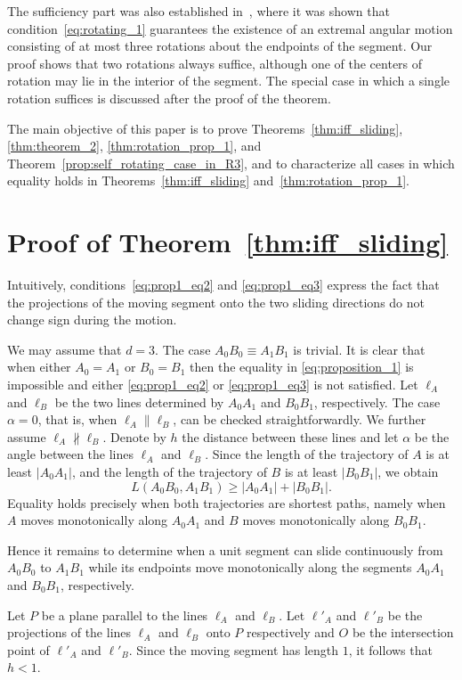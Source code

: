 \documentclass[a4paper,12pt,reqno]{amsart}
\begin{document}
The sufficiency part was also established in~\cite{IckingRoteWelzlYap1993}, where it was shown that condition~\eqref{eq:rotating_1} guarantees the existence of an extremal angular motion consisting of at most three rotations about the endpoints of the segment. Our proof shows that two rotations always suffice, although one of the centers of rotation may lie in the interior of the segment. The special case in which a single rotation suffices is discussed after the proof of the theorem.

\smallskip
The main objective of this paper is to prove Theorems~\ref{thm:iff_sliding}, \ref{thm:theorem_2}, \ref{thm:rotation_prop_1}, and Theorem~\ref{prop:self_rotating_case_in_R3}, and to characterize all cases in which equality holds in Theorems~\ref{thm:iff_sliding} and~\ref{thm:rotation_prop_1}. 


\section{Proof of Theorem~\ref{thm:iff_sliding}}
Intuitively, conditions~\eqref{eq:prop1_eq2} and \eqref{eq:prop1_eq3}
express the fact that the projections of the moving segment onto the two
sliding directions do not change sign during the motion.

We may assume that $d=3$. The case $A_0B_0\equiv A_1B_1$ is trivial. It is clear that when either $A_0=A_1$ or $B_0=B_1$ then the equality in \eqref{eq:proposition_1} is impossible and either \eqref{eq:prop1_eq2} or \eqref{eq:prop1_eq3} is not satisfied. Let $\ell_A$ and $\ell_B$ be the two lines determined by $A_0A_1$ and $B_0B_1$, respectively. The case $\alpha=0$, that is, when $\ell_A \parallel \ell_B$, can be checked straightforwardly. We further assume $\ell_A\nparallel \ell_B$. Denote by \(h\) the distance between these lines and let \(\alpha\) be the angle between the lines \(\ell_A\) and \(\ell_B\). Since the length of the trajectory of \(A\) is at least \(|A_0A_1|\), and the length of the trajectory of \(B\) is at least \(|B_0B_1|\), we obtain
\[
L(A_0B_0,A_1B_1)\ge |A_0A_1|+|B_0B_1|.
\]
Equality holds precisely when both trajectories are shortest paths,
namely when \(A\) moves monotonically along \(A_0A_1\) and \(B\) moves
monotonically along \(B_0B_1\).

Hence it remains to determine when a unit segment can slide continuously
from \(A_0B_0\) to \(A_1B_1\) while its endpoints move monotonically
along the segments \(A_0A_1\) and \(B_0B_1\), respectively.

Let $P$ be a plane parallel to the lines $\ell_A$ and $\ell_B$. Let $\ell'_A$ and $\ell'_B$ be the projections of the lines $\ell_A$ and $\ell_B$ onto $P$ respectively and \(O\) be the intersection point of $\ell'_A$ and $\ell'_B$. Since the moving segment has length \(1\), it follows that \(h<1\).
\end{document}
